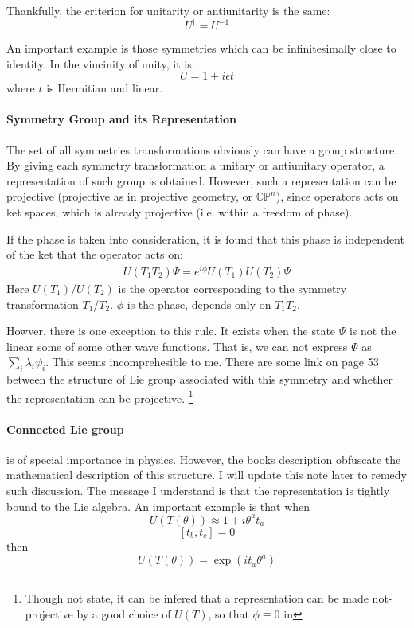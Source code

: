 \documentclass{article}
\numberwithin{equation}{subsection} %
\theoremstyle{definition}
\begin{document}
    Thankfully, the criterion for unitarity or antiunitarity is the same:
    $$U^\dagger = U^{-1}$$
    
    An important example is those symmetries which can be infinitesimally
    close to identity. In the vincinity of unity, it is:
    $$ U =1+i\epsilon t $$
    where $t$ is Hermitian and linear.

    \paragraph{Symmetry Group and its Representation} The set of all
    symmetries transformations obviously can have a group structure.
    By giving each symmetry transformation a unitary or antiunitary
    operator, a representation of such group is obtained. However,
    such a representation can be projective (projective as in
    projective geometry, or $\mathbb{CP}^n$), since operators acts
    on ket spaces, which is already projective (i.e. within a freedom of
    phase). 

    If the phase is taken into consideration, it is found that this
    phase is independent of the ket that the operator acts on:
    \begin{align}
        \label{eq:2.2_symmetries_projective_phase}
        U(T_1 T_2) \Psi = e^{i\phi} U(T_1) U(T_2) \Psi
    \end{align}
    Here $U(T_1)$/$U(T_2)$ is the operator corresponding to the symmetry
    transformation $T_1$/$T_2$. $\phi$ is the phase, depends only
    on $T_1 T_2$.

    Howver, there is one exception to this rule. It exists when the
    state $\Psi$ is not the linear some of some other wave functions.
    That is, we can not express $\Psi$ as $\sum_i \lambda_i \psi_i$.
    This seems incomprehesible to me.
    There are some link on page 53
    between the structure of Lie group associated
    with this symmetry and whether the representation can be projective.
    \footnote{Though not state, it can be infered that a representation
    can be made not-projective by a good choice of $U(T)$, so that
    $\phi \equiv 0$ in  }

    \paragraph{Connected Lie group} is of special importance in physics.
    However, the books description obfuscate the mathematical description
    of this structure. I will update this note later to remedy such
    discussion. The message I understand is that the representation is
    tightly bound to the Lie algebra. An important example is that when
    $$ U(T(\theta)) \approx 1 + i \theta^a t_a $$
    $$ [t_b,t_c] = 0$$
    then
    $$ U(T(\theta)) = \exp(it_a \theta^a) $$
\end{document}
